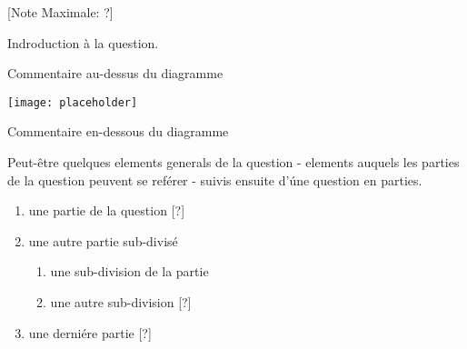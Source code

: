 \begin{question}
  \hspace*{\fill} [Note Maximale: ?]\par
  \medskip
  \noindent Indroduction à la question.\par
  \medskip
  \begin{center} %
    \noindent Commentaire au-dessus du diagramme\par
    \texttt{[image: placeholder]}\par
    \noindent Commentaire en-dessous du diagramme\par
  \end{center} %

  \noindent Peut-être quelques elements generals de la question - elements auquels les parties de la question peuvent se reférer - suivis ensuite d'úne question en parties.\par
  \begin{enumerate}[label=(\alph*)]
    \item une partie de la question\hspace*{\fill} [?]
    \item une autre partie sub-divisé
      \begin{enumerate}[label=(\roman*)]
        \item une sub-division de la partie %
        \item une autre sub-division\hspace*{\fill} [?]
      \end{enumerate}
    \item une derniére partie\hspace*{\fill} [?]
  \end{enumerate}
\end{question}
